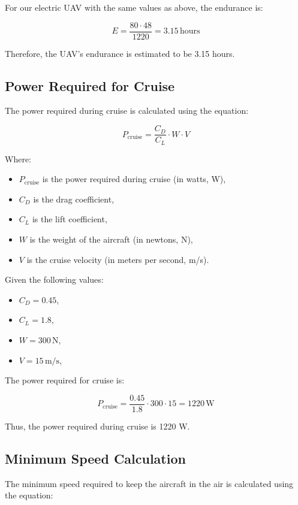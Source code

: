 \documentclass[12pt]{article}
\begin{document}
	For our electric UAV with the same values as above, the endurance is:
	
	\[
	E = \frac{80 \cdot 48}{1220} = 3.15 \, \text{hours}
	\]
	
	Therefore, the UAV's endurance is estimated to be 3.15 hours.
	
	\subsection{Power Required for Cruise}
	
	The power required during cruise is calculated using the equation:
	
	\begin{equation}
		P_{\text{cruise}} = \frac{C_D}{C_L} \cdot W \cdot V
	\end{equation}
	
	Where:
	\begin{itemize}
		\item \(P_{\text{cruise}}\) is the power required during cruise (in watts, W),
		\item \(C_D\) is the drag coefficient,
		\item \(C_L\) is the lift coefficient,
		\item \(W\) is the weight of the aircraft (in newtons, N),
		\item \(V\) is the cruise velocity (in meters per second, m/s).
	\end{itemize}
	
	Given the following values:
	\begin{itemize}
		\item \(C_D = 0.45\),
		\item \(C_L = 1.8\),
		\item \(W = 300 \, \text{N}\),
		\item \(V = 15 \, \text{m/s}\),
	\end{itemize}
	
	The power required for cruise is:
	
	\[
	P_{\text{cruise}} = \frac{0.45}{1.8} \cdot 300 \cdot 15 = 1220 \, \text{W}
	\]
	
	Thus, the power required during cruise is 1220 W.
	
	\subsection{Minimum Speed Calculation}
	
	The minimum speed required to keep the aircraft in the air is calculated using the equation:
	
\end{document}
